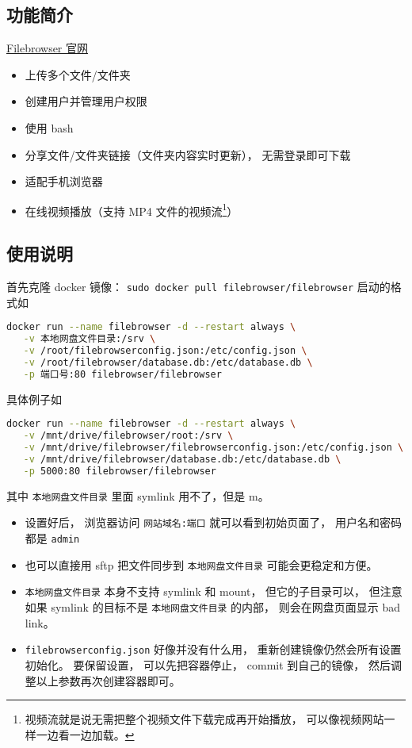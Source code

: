 
\subsection{功能简介}

\href{https://filebrowser.org/}{Filebrowser 官网}

\begin{itemize}
\item 上传多个文件/文件夹
\item 创建用户并管理用户权限
\item 使用 bash
\item 分享文件/文件夹链接（文件夹内容实时更新）， 无需登录即可下载
\item 适配手机浏览器
\item 在线视频播放（支持 MP4 文件的视频流\footnote{视频流就是说无需把整个视频文件下载完成再开始播放， 可以像视频网站一样一边看一边加载。}）
\end{itemize}

\subsection{使用说明}

首先克隆 docker 镜像： \verb`sudo docker pull filebrowser/filebrowser`
启动的格式如
\begin{lstlisting}[language=bash]
docker run --name filebrowser -d --restart always \
   -v 本地网盘文件目录:/srv \
   -v /root/filebrowserconfig.json:/etc/config.json \
   -v /root/filebrowser/database.db:/etc/database.db \
   -p 端口号:80 filebrowser/filebrowser
\end{lstlisting}
具体例子如 %
\begin{lstlisting}[language=bash]
docker run --name filebrowser -d --restart always \
   -v /mnt/drive/filebrowser/root:/srv \
   -v /mnt/drive/filebrowser/filebrowserconfig.json:/etc/config.json \
   -v /mnt/drive/filebrowser/database.db:/etc/database.db \
   -p 5000:80 filebrowser/filebrowser
\end{lstlisting}
其中 \verb`本地网盘文件目录` 里面 symlink 用不了，但是 m。

\begin{itemize}
\item 设置好后， 浏览器访问 \verb`网站域名:端口` 就可以看到初始页面了， 用户名和密码都是 \verb`admin`
\item 也可以直接用 sftp 把文件同步到 \verb`本地网盘文件目录` 可能会更稳定和方便。
\item \verb`本地网盘文件目录` 本身不支持 symlink 和 mount， 但它的子目录可以， 但注意如果 symlink 的目标不是 \verb`本地网盘文件目录` 的内部， 则会在网盘页面显示 bad link。
\item \verb`filebrowserconfig.json` 好像并没有什么用， 重新创建镜像仍然会所有设置初始化。 要保留设置， 可以先把容器停止， commit 到自己的镜像， 然后调整以上参数再次创建容器即可。
\end{itemize}

